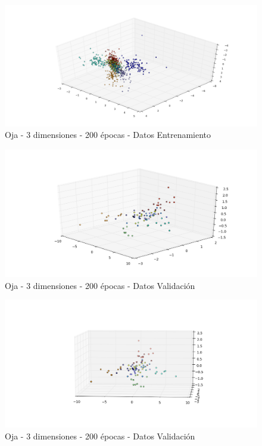 \begin{figure}[h]
  \begin{center}
    \includegraphics[scale=0.4]{../img/ej1/oja/alt-oja_3salida_200ep_train_4.png}
  \caption{Oja - 3 dimensiones - 200 épocas - Datos Entrenamiento}
  \end{center}
\end{figure}

\begin{figure}[h]
  \begin{center}
    \includegraphics[scale=0.6]{../img/ej1/oja/alt-oja_3salida_200ep_validation.png}
  \caption{Oja - 3 dimensiones - 200 épocas - Datos Validación}
  \end{center}
\end{figure}

\begin{figure}[h]
  \begin{center}
    \includegraphics[scale=0.6]{../img/ej1/oja/alt-oja_3salida_200ep_validation_2.png}
  \caption{Oja - 3 dimensiones - 200 épocas - Datos Validación}
  \end{center}
\end{figure}

